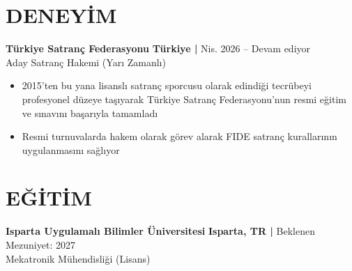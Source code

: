 \documentclass[11pt]{article}       %
\begin{document}

\vspace{-10pt}

\section*{DENEYİM}
\textbf{Türkiye Satranç Federasyonu} \hfill \textbf{Türkiye |} Nis. 2026 -- Devam ediyor \\
Aday Satranç Hakemi (Yarı Zamanlı) \\
\vspace{-9pt}
\begin{itemize}
  \item 2015'ten bu yana lisanslı satranç sporcusu olarak edindiği tecrübeyi profesyonel düzeye taşıyarak Türkiye Satranç Federasyonu'nun resmi eğitim ve sınavını başarıyla tamamladı
  \item Resmi turnuvalarda hakem olarak görev alarak FIDE satranç kurallarının uygulanmasını sağlıyor
\end{itemize}


\vspace{-6.5pt}

\section*{EĞİTİM}
\textbf{Isparta Uygulamalı Bilimler Üniversitesi} \hfill \textbf{Isparta, TR |} Beklenen Mezuniyet: 2027 \\
Mekatronik Mühendisliği (Lisans) \\[6pt]
\end{document}
